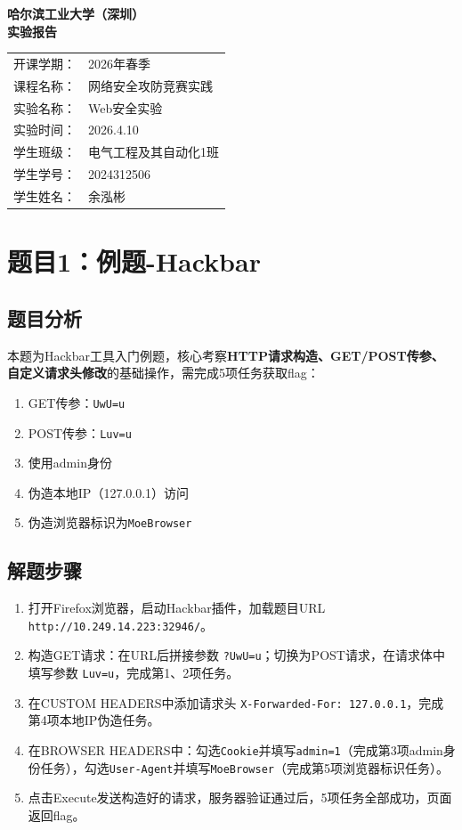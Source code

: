 \documentclass[12pt,a4paper,UTF8]{ctexart}
\begin{document}
\begin{center}
    \Huge \textbf{哈尔滨工业大学（深圳）} \\
    \vspace{1cm}
    \Huge \textbf{实验报告}
\end{center}

\vspace{1.5cm}

\begin{tabular}{ll}
    开课学期： & 2026年春季 \\
    课程名称： & 网络安全攻防竞赛实践 \\
    实验名称： & Web安全实验 \\
    实验时间： & 2026.4.10 \\
    学生班级： & 电气工程及其自动化1班 \\
    学生学号： & 2024312506 \\
    学生姓名： & 余泓彬 \\
\end{tabular}

\newpage

\section{题目1：例题-Hackbar}
\subsection{题目分析}
本题为Hackbar工具入门例题，核心考察\textbf{HTTP请求构造、GET/POST传参、自定义请求头修改}的基础操作，需完成5项任务获取flag：
\begin{enumerate}
    \item GET传参：\texttt{UwU=u}
    \item POST传参：\texttt{Luv=u}
    \item 使用admin身份
    \item 伪造本地IP（127.0.0.1）访问
    \item 伪造浏览器标识为\texttt{MoeBrowser}
\end{enumerate}

\subsection{解题步骤}
\begin{enumerate}
    \item 打开Firefox浏览器，启动Hackbar插件，加载题目URL \texttt{http://10.249.14.223:32946/}。
    \item 构造GET请求：在URL后拼接参数 \texttt{?UwU=u}；切换为POST请求，在请求体中填写参数 \texttt{Luv=u}，完成第1、2项任务。
    \item 在CUSTOM HEADERS中添加请求头 \texttt{X-Forwarded-For: 127.0.0.1}，完成第4项本地IP伪造任务。
    \item 在BROWSER HEADERS中：勾选\texttt{Cookie}并填写\texttt{admin=1}（完成第3项admin身份任务），勾选\texttt{User-Agent}并填写\texttt{MoeBrowser}（完成第5项浏览器标识任务）。
    \item 点击Execute发送构造好的请求，服务器验证通过后，5项任务全部成功，页面返回flag。
\end{enumerate}
\end{document}

